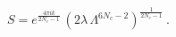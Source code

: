 \begin{equation}
\label{ML1}
S=e^{\frac{4 \pi i k}{2N_c-1}}\,\left(2 \lambda\,\Lambda^{6N_c-2}\right)^{\frac{1}{2N_c-1}}~.
\end{equation}

